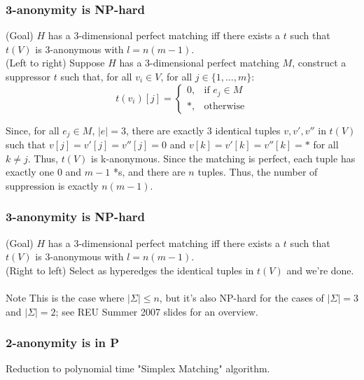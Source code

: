 \documentclass{beamer}
\begin{document}
\begin{frame}
\frametitle{3-anonymity is NP-hard}
\alert{(Goal)} $H$ has a 3-dimensional perfect matching iff there exists a $t$ such that $t(V)$ is 3-anonymous with $l = n(m-1)$.\\
\alert{(Left to right)} Suppose $H$ has a 3-dimensional perfect matching $M$, construct a suppressor $t$ such that, for all $v_i \in V$, for all $j \in \{1,...,m\}$:
$$
t(v_{i})[j] =
\begin{cases}
    0, & \text{if } e_j \in M\\
    *, & \text{otherwise}
\end{cases}
$$

Since, for all $e_j \in M$, $|e| = 3$, there are exactly 3 identical tuples $v, v', v''$ in $t(V)$ such that $v[j] = v'[j] = v''[j] = 0$ and $v[k] = v'[k] = v''[k] = *$ for all $k \neq j$. Thus, $t(V)$ is k-anonymous. Since the matching is perfect, each tuple has exactly one $0$ and $m-1$ *s, and there are $n$ tuples. Thus, the number of suppression is exactly $n(m-1)$.
\end{frame}

\begin{frame}
\frametitle{3-anonymity is NP-hard}
\alert{(Goal)} $H$ has a 3-dimensional perfect matching iff there exists a $t$ such that $t(V)$ is 3-anonymous with $l = n(m-1)$.\\
\alert{(Right to left)} Select as hyperedges the identical tuples in $t(V)$ and we're done.\\~\\

\alert{Note} This is the case where $|\Sigma| \leq n$, but it's also NP-hard for the cases of $|\Sigma| = 3$ and $|\Sigma| = 2$; see REU Summer 2007 slides for an overview.
\end{frame}

\begin{frame}
\frametitle{2-anonymity is in P}
Reduction to polynomial time "Simplex Matching" algorithm.
\end{frame}
\end{document}
